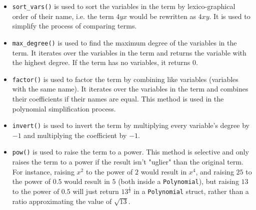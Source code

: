 \begin{itemize}
    \item \verb|sort_vars()| is used to sort the variables in the term by lexico-graphical order of their name, i.e. the term $4yx$ would be rewritten as $4xy$. It is used to simplify the process of comparing terms.
    \item \verb|max_degree()| is used to find the maximum degree of the variables in the term. It iterates over the variables in the term and returns the variable with the highest degree. If the term has no variables, it returns $0$.
    \item \verb|factor()| is used to factor the term by combining like variables (variables with the same name). It iterates over the variables in the term and combines their coefficients if their names are equal. This method is used in the polynomial simplification process.
    \item \verb|invert()| is used to invert the term by multiplying every variable's degree by $-1$ and multiplying the coefficient by $-1$.
    \item \verb|pow()| is used to raise the term to a power. This method is selective and only raises the term to a power if the result isn't "uglier" than the original term. For instance, raising $x^2$ to the power of $2$ would result in $x^4$, and raising $25$ to the power of $0.5$ would result in $5$ (both inside a \verb|Polynomial|), but raising $13$ to the power of $0.5$ will just return $13^{\frac{1}{2}}$ in a \verb|Polynomial| struct, rather than a ratio approximating the value of $\sqrt{13}$.
\end{itemize}

